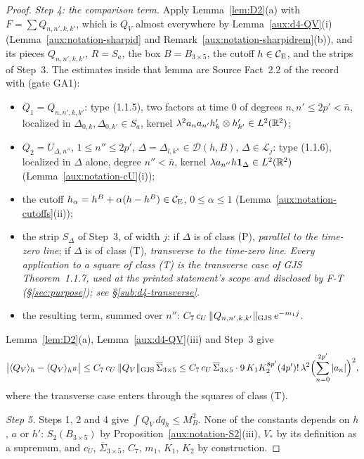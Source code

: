 \begin{proof}
\emph{Step 4: the comparison term.}  Apply Lemma~\ref{lem:D2}(a) with $F=\sum Q_{n,n',k,k'}$, which
is $Q_V$ almost everywhere by Lemma~\ref{aux:d4-QV}(i) (Lemma~\ref{aux:notation-sharpid} and
Remark~\ref{aux:notation-sharpidrem}(b)),
and its pieces $Q_{n,n',k,k'}$, $R=S_a$, the box $B=B_{3\times5}$, the cutoff $h\in\mathcal{C}_{\mathrm E}$, and the
strips of Step~3.  The estimates inside that lemma are Source Fact~2.2 of the record with (gate
GA1):
\begin{itemize}
\item $Q_1=Q_{n,n',k,k'}$: type (1.1.5), two factors at time $0$ of degrees $n,n'\le2p'<\bar n$,
  localized in $\Delta_{0,k},\Delta_{0,k'}\in S_a$, kernel
  $\lambda^2a_na_{n'}h'_k\otimes h'_{k'}\in L^2(\mathbb{R}^2)$;
\item $Q_2=U_{\Delta,n''}$, $1\le n''\le2p'$, $\Delta=\Delta_{l,k''}\in\mathcal D(h,B)$, $\Delta\in
  \mathcal L_j$: type (1.1.6), localized in $\Delta$ alone, degree $n''<\bar n$, kernel
  $\lambda a_{n''}h\mathbf 1_\Delta\in L^2(\mathbb{R}^2)$ (Lemma~\ref{aux:notation-cU}(i));
\item the cutoff $h_\alpha=h^B+\alpha(h-h^B)\in\mathcal{C}_{\mathrm E}$, $0\le\alpha\le1$
  (Lemma~\ref{aux:notation-cutoffs}(ii));
\item the strip $S_\Delta$ of Step~3, of width $j$: if $\Delta$ is of class (P), \emph{parallel to
  the time-zero line}; if $\Delta$ is of class (T), \emph{transverse to the time-zero line}.
  \emph{Every application to a square of class (T) is the transverse case of GJS
  Theorem~1.1.7, used at the printed statement's scope and disclosed by F-T
  (\S\ref{sec:purpose}); see \S\ref{sub:d4-transverse}.}
\item the resulting term, summed over $n''$: $C_7\,c_U\,\lVert Q_{n,n',k,k'}\rVert_{\mathrm{GJS}}\,e^{-m_1j}$.
\end{itemize}
Lemma~\ref{lem:D2}(a), Lemma~\ref{aux:d4-QV}(iii) and Step~3 give
\[
 \bigl|\langle Q_V\rangle_{h}-\langle Q_V\rangle_{h^B}\bigr|\le C_7\,c_U\,\lVert Q_V\rVert_{\mathrm{GJS}}\,\overline\Sigma_{3\times5}
 \le C_7\,c_U\,\overline\Sigma_{3\times5}\cdot9\,K_1K_2^{8p'}(4p')!\,\lambda^2
 \Bigl(\sum_{n=0}^{2p'}|a_n|\Bigr)^2 ,
\]
where the transverse case enters through the squares of class (T).

\emph{Step 5.}  Steps 1, 2 and 4 give $\int Q_V\,dq_h\le M_B^2$.  None of the constants depends on
$h$, $a$ or $h'$: $S_2(B_{3\times5})$ by Proposition~\ref{aux:notation-S2}(iii), $V_*$ by its
definition as a supremum, and $c_U$, $\overline\Sigma_{3\times5}$, $C_7$, $m_1$, $K_1$, $K_2$ by
construction.
\end{proof}

